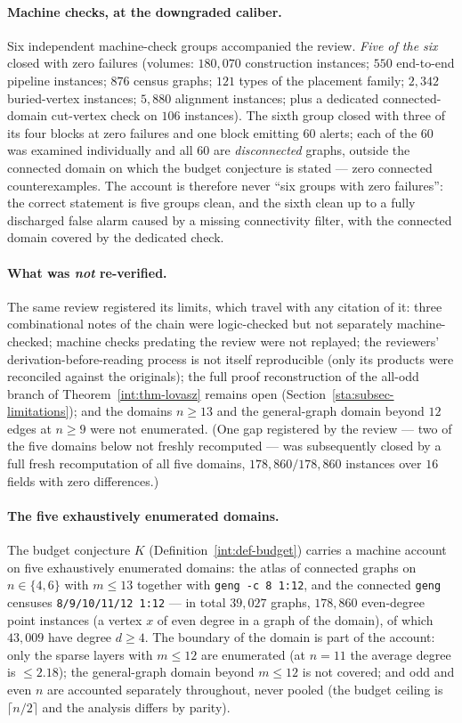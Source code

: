 \paragraph{Machine checks, at the downgraded caliber.} Six independent
machine-check groups accompanied the review. \emph{Five of the six} closed
with zero failures (volumes: $180{,}070$ construction instances;
$550$ end-to-end pipeline instances; $876$ census graphs; $121$ types of the
placement family; $2{,}342$ buried-vertex instances; $5{,}880$ alignment
instances; plus a dedicated connected-domain cut-vertex check on $106$
instances). The sixth group closed with three of its four blocks at zero
failures and one block emitting $60$ alerts; each of the $60$ was examined
individually and all $60$ are \emph{disconnected} graphs, outside the
connected domain on which the budget conjecture is stated --- zero connected
counterexamples. The account is therefore never ``six groups with zero
failures'': the correct statement is five groups clean, and the sixth clean
up to a fully discharged false alarm caused by a missing connectivity
filter, with the connected domain covered by the dedicated check.

\paragraph{What was \emph{not} re-verified.} The same review registered its
limits, which travel with any citation of it: three combinational notes of
the chain were logic-checked but not separately machine-checked; machine
checks predating the review were not replayed; the reviewers'
derivation-before-reading process is not itself reproducible (only its
products were reconciled against the originals); the full proof
reconstruction of the all-odd branch of Theorem~\ref{int:thm-lovasz}
remains open (Section~\ref{sta:subsec-limitations}); and the domains $n\ge13$
and the general-graph domain beyond $12$ edges at $n\ge9$ were not
enumerated. (One gap registered by the review --- two of the five domains
below not freshly recomputed --- was subsequently closed by a full fresh
recomputation of all five domains, $178{,}860/178{,}860$ instances over
$16$ fields with zero differences.)

\paragraph{The five exhaustively enumerated domains.} The budget conjecture
$K$ (Definition~\ref{int:def-budget}) carries a machine account on five
exhaustively enumerated domains: the atlas of connected graphs on
$n\in\{4,6\}$ with $m\le13$ together with \texttt{geng -c 8 1:12}, and the
connected \texttt{geng} censuses \texttt{8/9/10/11/12 1:12} --- in total
$39{,}027$ graphs, $178{,}860$ even-degree point instances
(a vertex $x$ of even degree in a graph of the domain), of which $43{,}009$
have degree $d\ge4$. The boundary of the domain is part of the account: only
the sparse layers with $m\le12$ are enumerated (at $n=11$ the average degree
is $\le2.18$); the general-graph domain beyond $m\le12$ is not covered; and
odd and even $n$ are accounted separately throughout, never pooled (the
budget ceiling is $\lceil n/2\rceil$ and the analysis differs by parity).


